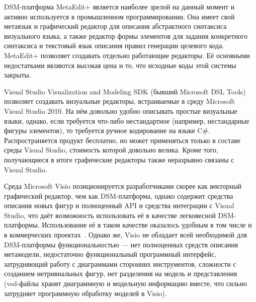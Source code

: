 \documentclass[a4paper]{article}
\begin{document}
DSM-платформа MetaEdit+ является наиболее зрелой на данный момент и активно используется в промышленном программировании. Она имеет свой метаязык и графический редактор для описания абстрактного синтаксиса визуального языка, а также редактор формы элементов для задания конкретного синтаксиса и текстовый язык описания правил генерации целевого кода. MetaEdit+ позволяет создавать отдельно работающие редакторы. Её основными недостатками являются высокая цена и то, что исходные коды этой системы закрыты.

Visual Studio Visualization and Modeling SDK (бывший Microsoft DSL Tools) позволяет создавать визуальные редакторы, встраиваемые в среду Microsoft Visual Studio 2010. На нём довольно удобно описывать простые визуальные языки, однако, если требуется что-либо нестандартное (например, нестандарные фигуры элементов), то требуется ручное кодирование на языке C\#. Распространяется продукт бесплатно, но может применяться только в составе среды Visual Studio, стоимость которой довольно велика. Кроме того, получающиеся в итоге графические редакторы также неразрывно связаны с Visual Studio.

Среда Microsoft Visio позиционируется разработчиками скорее как векторный графический редактор, чем как DSM-платформа, однако содержит средства описания новых фигур и полноценный API и средства интеграции с Visual Studio, что даёт возможность использовать её в качестве легковесной DSM-платформы. Использование её в таком качестве оказалось удобным в том числе и в коммерческих проектах~\cite{videoDsl}. Однако же, Visio не обладает всей необходимой для DSM-платформы функциональностью --- нет полноценных средств описания метамодели, недостаточно функциональный программный интерфейс, затрудняющий работу с диаграммами сторонних инструментов, сложности с созданием нетривиальных фигур, нет разделения на модель и представления (vsd-файлы хранят диаграммную и модельную информацию вместе, что сильно затрудняет программную обработку моделей в Visio). 
\end{document}
